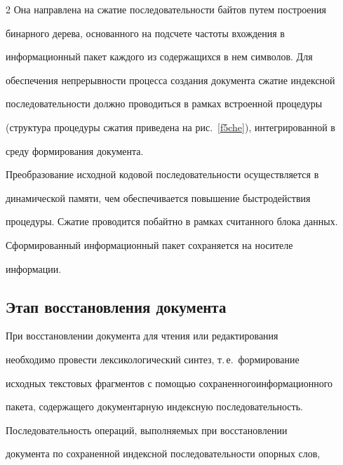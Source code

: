 \begin{multicols}{2}
Она направлена на сжатие последовательности байтов путем построения 


бинарного дерева, основанного на подсчете частоты вхождения в 


информационный пакет каждого из содержащихся в нем символов. Для 


обеспечения непрерывности процесса создания документа сжатие индексной 


последовательности должно проводиться в рамках встроенной процедуры 


(структура процедуры сжатия приведена на рис.~\ref{f5che}), интегрированной в 


среду формирования документа.





     Преобразование исходной кодовой последовательности осуществляется в 


динамической памяти, чем обеспечивается повышение быстродействия 


процедуры. Сжатие проводится побайтно в рамках считанного блока данных.


     


     Сформированный информационный пакет сохраняется на носителе 


информации.


     


     \subsection*{Этап восстановления документа}


     


     При восстановлении документа для чтения или редактирования 


необходимо провести лексикологический синтез, т.\,е.\ формирование 


исходных текстовых фрагментов с помощью сохраненного\linebreak информационного 


пакета, содержащего документарную индексную последовательность.


     


     Последовательность операций, выполняемых при восстановлении 


документа по сохраненной индексной последовательности опорных слов, 



\end{multicols}
